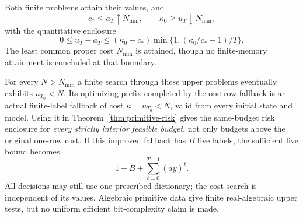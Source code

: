 \begin{theorem}\label{thm:interior-budget}
Both finite problems attain their values, and
\[
 c_*\le a_T\uparrow N_{\min},\qquad
 \kappa_0\ge u_T\downarrow N_{\min},
\]
with the quantitative enclosure
\begin{equation}\label{eq:cost-enclosure}
 0\le u_T-a_T\le(\kappa_0-c_*)\min\{1,(\kappa_0/c_*-1)/T\}.
\end{equation}
The least common proper cost $N_{\min}$ is attained, though no finite-memory attainment is concluded at that boundary.

For every $N>N_{\min}$ a finite search through these upper problems eventually exhibits $u_{T_0}<N$. Its optimizing prefix completed by the one-row fallback is an actual finite-label fallback of cost $\kappa=u_{T_0}<N$, valid from every initial state and model. Using it in Theorem~\ref{thm:primitive-risk} gives the same-budget risk enclosure for \emph{every strictly interior feasible budget}, not only budgets above the original one-row cost. If this improved fallback has $B$ live labels, the sufficient live bound becomes
\[
 1+B+\sum_{t=0}^{T-1}(ay)^t.
\]
All decisions may still use one prescribed dictionary; the cost search is independent of its values. Algebraic primitive data give finite real-algebraic upper tests, but no uniform efficient bit-complexity claim is made.
\end{theorem}
